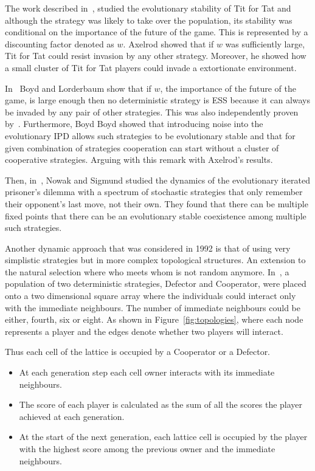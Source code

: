 \documentclass{article}
\theoremstyle{definition}
\begin{document}
The work described in~\cite{axelrod1981}, studied the evolutionary stability of
Tit for Tat and although the strategy was likely to take over the population, its
stability was conditional on the importance of the future of the game. This is
represented by a discounting factor denoted as \(w\). Axelrod showed that if \(w\)
was sufficiently large, Tit for Tat could resist invasion by any other strategy.
Moreover, he showed how a small cluster of Tit for Tat players could invade a extortionate
environment.

In~\cite{Boyd1987} Boyd and Lorderbaum show that if \(w\), the importance of the
future of the game, is large enough then no deterministic strategy is ESS because
it can always be invaded by any pair of other strategies.
This was also independently proven by~\cite{Pudaite1987}.
Furthermore, Boyd Boyd showed that introducing noise into the evolutionary IPD allows such
strategies to be evolutionary stable and that for given combination of
strategies cooperation can start without a cluster of
cooperative strategies. Arguing with this remark  with Axelrod's results.

Then, in~\cite{nowak1989}, Nowak and Sigmund studied the dynamics of the evolutionary
iterated prisoner's dilemma with a spectrum of stochastic strategies that only
remember their opponent's last move, not their own. They found that there can be
multiple fixed points that there can be an evolutionary stable coexistence among
multiple such strategies.

Another dynamic approach that was considered in 1992 is that of using very simplistic
strategies but in more complex topological structures. An extension to the natural selection
where who meets whom is not random anymore. In~\cite{Nowak1992b}, a population
of two deterministic strategies, Defector and Cooperator, were placed onto a two
dimensional square array where the individuals could interact only with the immediate
neighbours. The number of immediate neighbours could be either, fourth, six or eight. As
shown in Figure~\ref{fig:topologies}, where each node represents a player and the
edges denote whether two players will interact.

Thus each cell of the lattice is occupied by a Cooperator or a Defector.
\begin{itemize}
    \item At each generation step each cell owner interacts with its immediate neighbours.
    \item The score of each player is calculated as the sum of all the scores the player
    achieved at each generation.
    \item At the start of the next generation, each lattice
    cell is occupied by the player with the highest score among the previous owner
    and the immediate neighbours.
\end{itemize}
\end{document}
